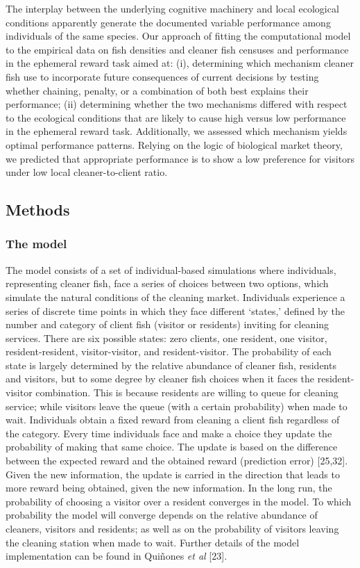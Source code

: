 \documentclass[10pt,letterpaper]{article}
\begin{document}
The interplay between the underlying cognitive machinery and local
ecological conditions apparently generate the documented variable
performance among individuals of the same species. Our approach of
fitting the computational model to the empirical data on fish densities
and cleaner fish censuses and performance in the ephemeral reward task
aimed at: (i), determining which mechanism cleaner fish use to
incorporate future consequences of current decisions by testing whether
chaining, penalty, or a combination of both best explains their
performance; (ii) determining whether the two mechanisms differed with
respect to the ecological conditions that are likely to cause high
versus low performance in the ephemeral reward task. Additionally, we
assessed which mechanism yields optimal performance patterns. Relying on
the logic of biological market theory, we predicted that appropriate
performance is to show a low preference for visitors under low local
cleaner-to-client ratio.

\hypertarget{methods}{%
\subsection{Methods}\label{methods}}

\hypertarget{the-model}{%
\subsubsection{The model}\label{the-model}}

The model consists of a set of individual-based simulations where
individuals, representing cleaner fish, face a series of choices between
two options, which simulate the natural conditions of the cleaning
market. Individuals experience a series of discrete time points in which
they face different `states,' defined by the number and category of
client fish (visitor or residents) inviting for cleaning services. There
are six possible states: zero clients, one resident, one visitor,
resident-resident, visitor-visitor, and resident-visitor. The
probability of each state is largely determined by the relative
abundance of cleaner fish, residents and visitors, but to some degree by
cleaner fish choices when it faces the resident-visitor combination.
This is because residents are willing to queue for cleaning service;
while visitors leave the queue (with a certain probability) when made to
wait. Individuals obtain a fixed reward from cleaning a client fish
regardless of the category. Every time individuals face and make a
choice they update the probability of making that same choice. The
update is based on the difference between the expected reward and the
obtained reward (prediction error) {[}25,32{]}. Given the new
information, the update is carried in the direction that leads to more
reward being obtained, given the new information. In the long run, the
probability of choosing a visitor over a resident converges in the
model. To which probability the model will converge depends on the
relative abundance of cleaners, visitors and residents; as well as on
the probability of visitors leaving the cleaning station when made to
wait. Further details of the model implementation can be found in
Quiñones \emph{et al} {[}23{]}.
\end{document}
